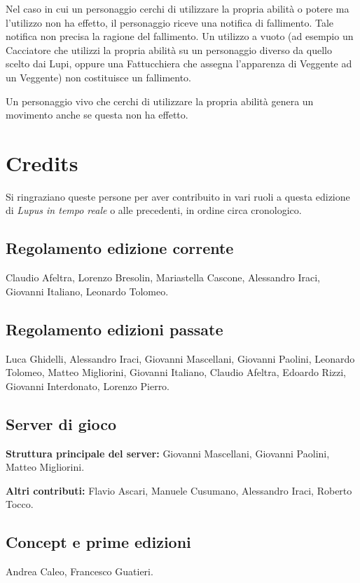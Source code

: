 \documentclass[a4paper,10pt]{article}
\begin{document}
Nel caso in cui un personaggio cerchi di utilizzare la propria abilità o potere ma l'utilizzo non ha effetto, il personaggio riceve una notifica di fallimento. Tale notifica non precisa la ragione del fallimento. Un utilizzo a vuoto (ad esempio un Cacciatore che utilizzi la propria abilità su un personaggio diverso da quello scelto dai Lupi, oppure una Fattucchiera che assegna l'apparenza di Veggente ad un Veggente) non costituisce un fallimento.

Un personaggio vivo che cerchi di utilizzare la propria abilità genera un movimento anche se questa non ha effetto.

\section{Credits}\label{credits}

Si ringraziano queste persone per aver contribuito in vari ruoli a questa edizione di \emph{Lupus in tempo reale} o alle precedenti, in ordine circa cronologico.

\subsection*{Regolamento edizione corrente}

Claudio Afeltra, Lorenzo Bresolin, Mariastella Cascone, Alessandro Iraci, Giovanni Italiano, Leonardo Tolomeo.


\subsection*{Regolamento edizioni passate}

Luca Ghidelli, Alessandro Iraci, Giovanni Mascellani, Giovanni Paolini, Leonardo Tolomeo, Matteo Migliorini, Giovanni Italiano, Claudio Afeltra, Edoardo Rizzi, Giovanni Interdonato, Lorenzo Pierro.

\subsection*{Server di gioco}

\textbf{Struttura principale del server:} Giovanni Mascellani, Giovanni Paolini, Matteo Migliorini.

\textbf{Altri contributi:} Flavio Ascari, Manuele Cusumano, Alessandro Iraci, Roberto Tocco.

\subsection*{Concept e prime edizioni}

Andrea Caleo, Francesco Guatieri.
\end{document}
